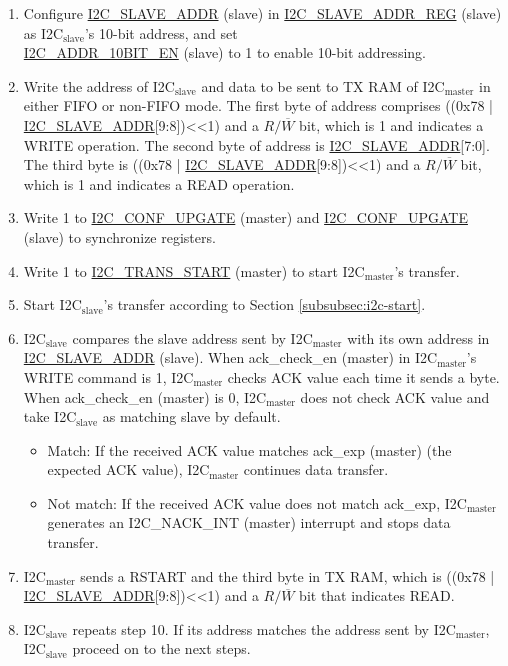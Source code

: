 \documentclass[main\_\_EN.tex]{subfiles}
\begin{document}
\begin{enumerate}
\item Configure \hyperref[fielddesc:I2CSLAVEADDR]{I2C\_SLAVE\_ADDR} (slave) in \hyperref[regdesc:I2CSLAVEADDRREG]{I2C\_SLAVE\_ADDR\_REG} (slave) as I2C$_\text{slave}$'s 10-bit address, and set \\\hyperref[fielddesc:I2CADDR10BITEN]{I2C\_ADDR\_10BIT\_EN} (slave) to 1 to enable 10-bit addressing.
\item Write the address of I2C$_\text{slave}$ and data to be sent to TX RAM of I2C$_\text{master}$ in either FIFO or non-FIFO mode. The first byte of address comprises ((0x78 | \hyperref[fielddesc:I2CSLAVEADDR]{I2C\_SLAVE\_ADDR}[9:8])<<1) and a $R/\overline W$ bit, which is 1 and indicates a WRITE operation. The second byte of address is \hyperref[fielddesc:I2CSLAVEADDR]{I2C\_SLAVE\_ADDR}[7:0]. The third byte is ((0x78 | \hyperref[fielddesc:I2CSLAVEADDR]{I2C\_SLAVE\_ADDR}[9:8])<<1) and a $R/\overline W$ bit, which is 1 and indicates a READ operation.

\item Write 1 to \hyperref[fielddesc:I2CCONFUPGATE]{I2C\_CONF\_UPGATE} (master) and \hyperref[fielddesc:I2CCONFUPGATE]{I2C\_CONF\_UPGATE} (slave) to synchronize registers.
\item Write 1 to \hyperref[fielddesc:I2CTRANSSTART]{I2C\_TRANS\_START} (master) to start I2C$_\text{master}$'s transfer.
\item Start I2C$_\text{slave}$'s transfer according to Section \ref{subsubsec:i2c-start}.
\item I2C$_\text{slave}$ compares the slave address sent by I2C$_\text{master}$ with its own address in \hyperref[fielddesc:I2CSLAVEADDR]{I2C\_SLAVE\_ADDR} (slave). When ack\_check\_en (master) in I2C$_\text{master}$'s WRITE command is 1, I2C$_\text{master}$ checks ACK value each time it sends a byte. When ack\_check\_en (master) is 0, I2C$_\text{master}$ does not check ACK value and take I2C$_\text{slave}$ as matching slave by default.
\begin{itemize}
\item Match: If the received ACK value matches ack\_exp (master) (the expected ACK value), I2C$_\text{master}$ continues data transfer.
\item Not match: If the received ACK value does not match ack\_exp, I2C$_\text{master}$ generates an I2C\_NACK\_INT (master) interrupt and stops data transfer.
\end{itemize}

\item I2C$_\text{master}$ sends a RSTART and the third byte in TX RAM, which is ((0x78 | \hyperref[fielddesc:I2CSLAVEADDR]{I2C\_SLAVE\_ADDR}[9:8])<<1) and a $R/\overline W$ bit that indicates READ.
\item I2C$_\text{slave}$ repeats step 10. If its address matches the address sent by I2C$_\text{master}$, I2C$_\text{slave}$ proceed on to the next steps.


\end{enumerate}
\end{document}
